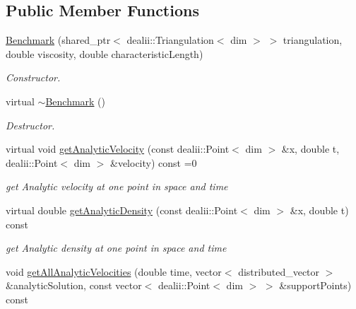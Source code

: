 \subsection*{Public Member Functions}
\begin{DoxyCompactItemize}
\item 
\hypertarget{classnatrium_1_1Benchmark_a1e363ed027e7d466bb21a72128922d24}{\hyperlink{classnatrium_1_1Benchmark_a1e363ed027e7d466bb21a72128922d24}{Benchmark} (shared\-\_\-ptr$<$ dealii\-::\-Triangulation$<$ dim $>$ $>$ triangulation, double viscosity, double characteristic\-Length)}\label{classnatrium_1_1Benchmark_a1e363ed027e7d466bb21a72128922d24}

\begin{DoxyCompactList}\small\item\em Constructor. \end{DoxyCompactList}\item 
\hypertarget{classnatrium_1_1Benchmark_a9560e49a097a369ec972b72fb2873a2e}{virtual \hyperlink{classnatrium_1_1Benchmark_a9560e49a097a369ec972b72fb2873a2e}{$\sim$\-Benchmark} ()}\label{classnatrium_1_1Benchmark_a9560e49a097a369ec972b72fb2873a2e}

\begin{DoxyCompactList}\small\item\em Destructor. \end{DoxyCompactList}\item 
\hypertarget{classnatrium_1_1Benchmark_a52241103d87abdd89b880a0ec87cc359}{virtual void \hyperlink{classnatrium_1_1Benchmark_a52241103d87abdd89b880a0ec87cc359}{get\-Analytic\-Velocity} (const dealii\-::\-Point$<$ dim $>$ \&x, double t, dealii\-::\-Point$<$ dim $>$ \&velocity) const =0}\label{classnatrium_1_1Benchmark_a52241103d87abdd89b880a0ec87cc359}

\begin{DoxyCompactList}\small\item\em get Analytic velocity at one point in space and time \end{DoxyCompactList}\item 
\hypertarget{classnatrium_1_1Benchmark_a99a915af5bc0c79f5d5c8a8eac0dcbbe}{virtual double \hyperlink{classnatrium_1_1Benchmark_a99a915af5bc0c79f5d5c8a8eac0dcbbe}{get\-Analytic\-Density} (const dealii\-::\-Point$<$ dim $>$ \&x, double t) const }\label{classnatrium_1_1Benchmark_a99a915af5bc0c79f5d5c8a8eac0dcbbe}

\begin{DoxyCompactList}\small\item\em get Analytic density at one point in space and time \end{DoxyCompactList}\item 
\hypertarget{classnatrium_1_1Benchmark_a2cb79a2f6325a72ad7b9109902b6688e}{void \hyperlink{classnatrium_1_1Benchmark_a2cb79a2f6325a72ad7b9109902b6688e}{get\-All\-Analytic\-Velocities} (double time, vector$<$ distributed\-\_\-vector $>$ \&analytic\-Solution, const vector$<$ dealii\-::\-Point$<$ dim $>$ $>$ \&support\-Points) const }\label{classnatrium_1_1Benchmark_a2cb79a2f6325a72ad7b9109902b6688e}


\end{DoxyCompactItemize}
